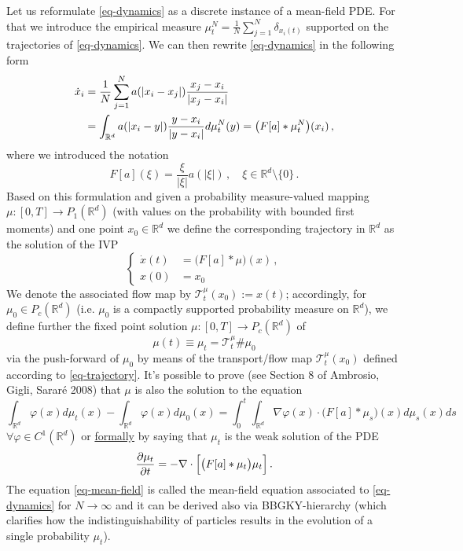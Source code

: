 \documentclass[A4paper,11pt]{article}
\theoremstyle{definition}
\newcommand{\R}{\mathbb{R}}
\begin{document}
Let us reformulate \eqref{eq-dynamics} as a discrete instance of a mean-field PDE. For that we introduce the empirical measure $\mu_t^N=\frac{1}{N}\sum_{j=1}^N\delta_{x_i(t)}$ supported on the trajectories of \eqref{eq-dynamics}. We can then rewrite \eqref{eq-dynamics} in the following form
\begin{align}
	\dot x_i
		&=\frac{1}{N}\sum_{j=1}^N a(|x_i-x_j|)\frac{x_j-x_i}{|x_j-x_i|}\notag\\
		&=\int_{\R^d} a(|x_i-y|)\frac{y-x_i}{|y-x_i|}d\mu_t^N(y)
			=\bigl(F[a]\ast\mu_t^N\bigr)(x_i)\,,
\end{align}
where we introduced the notation
\[
	F[a](\xi)=\frac{\xi}{|\xi|}a(|\xi|)\,,\quad\xi\in\R^d\setminus\{0\}\,.
\]
Based on this formulation and given a probability measure-valued mapping $\mu:[0,T]\rightarrow P_1(\R^d)$ (with values on the probability with bounded first moments) and one point $x_0\in\R^d$ we define the corresponding trajectory in $\R^d$ as the solution of the IVP
\begin{equation}\label{eq-trajectory}
	\left\{\begin{split}
		\dot x(t)&=\bigl(F[a]\ast\mu\bigr)(x)\,,\\
		x(0)&=x_0
	\end{split}\right.
\end{equation}
We denote the associated flow map by $\mathcal{T}^\mu_t(x_0):=x(t)$; accordingly, for $\mu_0\in P_c(\R^d)$ (i.e. $\mu_0$ is a compactly supported probability measure on $\R^d$), we define further the fixed point solution $\mu:[0,T]\rightarrow P_c(\R^d)$ of
\begin{equation}\label{eq-fixed}
	\mu(t)\equiv \mu_t=\mathcal{T}^\mu_t\#\mu_0
\end{equation}
via the push-forward of $\mu_0$ by means of the transport/flow map $\mathcal{T}^\mu_t(x_0)$ defined according to \eqref{eq-trajectory}. It's possible to prove (see Section 8 of Ambrosio, Gigli, Sarar\'e 2008) that $\mu$ is also the solution to the equation
\begin{equation}\label{eq-pushforward}
	\int_{\R^d}\varphi(x)d\mu_t(x)-\int_{\R^d}\varphi(x)d\mu_0(x)
		=\int_0^t \int_{\mathbb R^d} \nabla\varphi(x)\cdot \bigl(F[a]\ast\mu_s\bigr)(x)d\mu_s(x) ds
\end{equation}
$\forall\varphi\in C^1(\R^d)$ or \underline{formally} by saying that $\mu_t$ is the weak solution of the PDE
\begin{equation}\label{eq-mean-field}
	\frac{\partial\mu_t}{\partial t}=-\nabla\cdot\Bigl[\bigl(F[a]\ast\mu_t\bigr)\mu_t\Bigr]\,.
\end{equation}
The equation \eqref{eq-mean-field} is called the mean-field equation associated to \eqref{eq-dynamics} for $N\rightarrow\infty$ and it can be derived also via BBGKY-hierarchy (which clarifies how the indistinguishability of particles results in the evolution of a single probability $\mu_t$).
\end{document}
